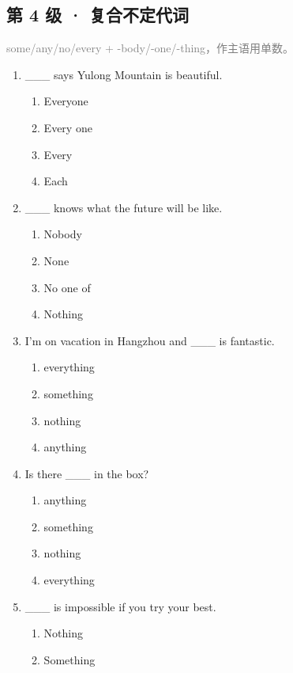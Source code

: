 \documentclass[11pt,a4paper]{ctexart}
\begin{document}
\subsection*{第 4 级 · 复合不定代词}
\noindent\textcolor{gray}{some/any/no/every + -body/-one/-thing，作主语用单数。}\par\smallskip
\begin{enumerate}[leftmargin=*,itemsep=4pt]
\item \_\_\_ says Yulong Mountain is beautiful.
\begin{enumerate}[label=\Alph*.,leftmargin=2em,itemsep=1pt,topsep=2pt]
\item Everyone
\item Every one
\item Every
\item Each
\end{enumerate}
\item \_\_\_ knows what the future will be like.
\begin{enumerate}[label=\Alph*.,leftmargin=2em,itemsep=1pt,topsep=2pt]
\item Nobody
\item None
\item No one of
\item Nothing
\end{enumerate}
\item I’m on vacation in Hangzhou and \_\_\_ is fantastic.
\begin{enumerate}[label=\Alph*.,leftmargin=2em,itemsep=1pt,topsep=2pt]
\item everything
\item something
\item nothing
\item anything
\end{enumerate}
\item Is there \_\_\_ in the box?
\begin{enumerate}[label=\Alph*.,leftmargin=2em,itemsep=1pt,topsep=2pt]
\item anything
\item something
\item nothing
\item everything
\end{enumerate}
\item \_\_\_ is impossible if you try your best.
\begin{enumerate}[label=\Alph*.,leftmargin=2em,itemsep=1pt,topsep=2pt]
\item Nothing
\item Something

\end{enumerate}
\end{enumerate}
\end{document}
